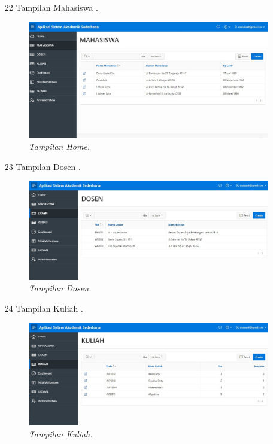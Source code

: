 \begin{enumerate}
\item[22]Tampilan Mahasiswa .
\begin{figure}[!htbp]
    \begin{center}
    \includegraphics[scale=0.3]{figures/mhs.jpg}
    \caption{\textit{Tampilan Home.}}
    \end{center}
\end{figure}
\par

\item[23]Tampilan Dosen .
\begin{figure}[!htbp]
    \begin{center}
    \includegraphics[scale=0.3]{figures/dsn.jpg}
    \caption{\textit{Tampilan Dosen.}}
    \end{center}
\end{figure}
\par

\item[24]Tampilan Kuliah .
\begin{figure}[!htbp]
    \begin{center}
    \includegraphics[scale=0.3]{figures/klh.jpg}
    \caption{\textit{Tampilan Kuliah.}}
    \end{center}
\end{figure}
\par


\end{enumerate}
